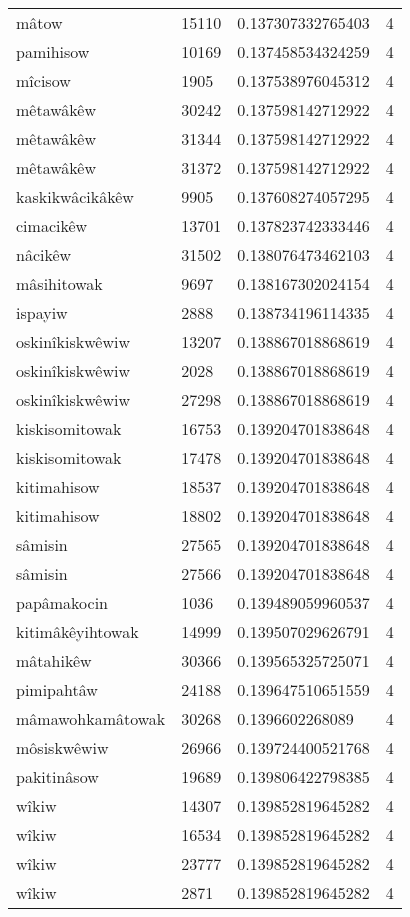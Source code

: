 \begin{longtable}{llll}
mâtow & 15110 & 0.137307332765403 & 4 \\
pamihisow & 10169 & 0.137458534324259 & 4 \\
mîcisow & 1905 & 0.137538976045312 & 4 \\
mêtawâkêw & 30242 & 0.137598142712922 & 4 \\
mêtawâkêw & 31344 & 0.137598142712922 & 4 \\
mêtawâkêw & 31372 & 0.137598142712922 & 4 \\
kaskikwâcikâkêw & 9905 & 0.137608274057295 & 4 \\
cimacikêw & 13701 & 0.137823742333446 & 4 \\
nâcikêw & 31502 & 0.138076473462103 & 4 \\
mâsihitowak & 9697 & 0.138167302024154 & 4 \\
ispayiw & 2888 & 0.138734196114335 & 4 \\
oskinîkiskwêwiw & 13207 & 0.138867018868619 & 4 \\
oskinîkiskwêwiw & 2028 & 0.138867018868619 & 4 \\
oskinîkiskwêwiw & 27298 & 0.138867018868619 & 4 \\
kiskisomitowak & 16753 & 0.139204701838648 & 4 \\
kiskisomitowak & 17478 & 0.139204701838648 & 4 \\
kitimahisow & 18537 & 0.139204701838648 & 4 \\
kitimahisow & 18802 & 0.139204701838648 & 4 \\
sâmisin & 27565 & 0.139204701838648 & 4 \\
sâmisin & 27566 & 0.139204701838648 & 4 \\
papâmakocin & 1036 & 0.139489059960537 & 4 \\
kitimâkêyihtowak & 14999 & 0.139507029626791 & 4 \\
mâtahikêw & 30366 & 0.139565325725071 & 4 \\
pimipahtâw & 24188 & 0.139647510651559 & 4 \\
mâmawohkamâtowak & 30268 & 0.1396602268089 & 4 \\
môsiskwêwiw & 26966 & 0.139724400521768 & 4 \\
pakitinâsow & 19689 & 0.139806422798385 & 4 \\
wîkiw & 14307 & 0.139852819645282 & 4 \\
wîkiw & 16534 & 0.139852819645282 & 4 \\
wîkiw & 23777 & 0.139852819645282 & 4 \\
wîkiw & 2871 & 0.139852819645282 & 4 \\

\end{longtable}
